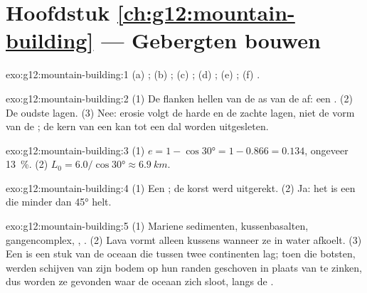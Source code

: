 \section*{Hoofdstuk \ref{ch:g12:mountain-building} --- Gebergten bouwen}

\begin{solution}{exo:g12:mountain-building:1}
(a) ; (b) ; (c) ; (d) ; (e) ;
(f) .
\end{solution}

\begin{solution}{exo:g12:mountain-building:2}
(1) De flanken hellen van de as van de  af: een . (2) De oudste
lagen. (3) Nee: erosie volgt de harde en de zachte lagen, niet de vorm
van de ; de kern van een  kan tot een dal worden uitgesleten.
\end{solution}

\begin{solution}{exo:g12:mountain-building:3}
(1) $e = 1 - \cos\ang{30} = 1 - 0.866 = 0.134$, ongeveer \qty{13}{\percent}.
(2) $L_0 = 6.0/\cos\ang{30} \approx \qty{6.9}{km}$.
\end{solution}

\begin{solution}{exo:g12:mountain-building:4}
(1) Een ; de korst werd uitgerekt. (2) Ja: het is een 
die minder dan \ang{45} helt.
\end{solution}

\begin{solution}{exo:g12:mountain-building:5}
(1) Mariene sedimenten, kussenbasalten, gangencomplex, , .
(2) Lava vormt alleen kussens wanneer ze in water afkoelt. (3) Een  is een
stuk van de oceaan die tussen twee continenten lag; toen die botsten,
werden schijven van zijn bodem op hun randen geschoven in plaats van te zinken, dus
worden ze gevonden waar de oceaan zich sloot, langs de .
\end{solution}

